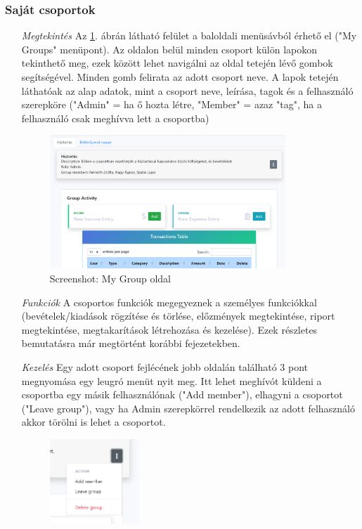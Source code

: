 \subsubsection{Saját csoportok}
\begin{itemize}
	\item[\emph{Megtekintés}]	 Az \ref{fig:group}. ábrán látható felület a baloldali menüsávból érhető el ("My Groups" menüpont). Az oldalon belül minden csoport külön lapokon tekinthető meg, ezek között lehet navigálni az oldal tetején lévő gombok segítségével. Minden gomb felirata az adott csoport neve. A lapok tetején láthatóak az alap adatok, mint a csoport neve, leírása, tagok és a felhasználó szerepköre ("Admin" = ha ő hozta létre, "Member" = azaz "tag", ha a felhasználó csak meghívva lett a csoportba)
	\begin{figure}[H]
		\centering
		\includegraphics[height=190px]{img/group}
		\caption{Screenshot: My Group oldal}
		\label{fig:group}
	\end{figure}
		\item[\emph{Funkciók}] A csoportos funkciók megegyeznek a személyes funkciókkal (bevételek/kiadások rögzítése és törlése, előzmények megtekintése, riport megtekintése, megtakarítások létrehozása és kezelése). Ezek részletes bemutatásra már megtörtént korábbi fejezetekben.
	\item[\emph{Kezelés}] Egy adott csoport fejlécének jobb oldalán található 3 pont megnyomása egy leugró menüt nyit meg. Itt lehet meghívót küldeni a csoportba egy másik felhasználónak ("Add member"), elhagyni a csoportot ("Leave group"), vagy ha Admin szerepkörrel rendelkezik az adott felhasználó akkor törölni is lehet a csoportot.
	\begin{figure}[H]
		\centering
		\includegraphics[height=120px]{img/group-actions}

\end{figure}
\end{itemize}

